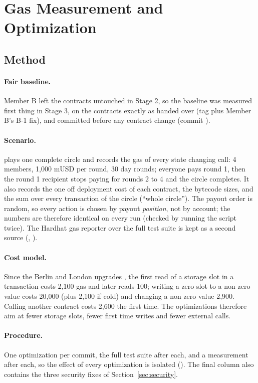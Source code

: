 \section{Gas Measurement and Optimization}
\label{sec:gas}

\subsection{Method}
\paragraph{Fair baseline.} Member B left the contracts untouched in Stage 2, so the baseline was
measured first thing in Stage 3, on the contracts exactly as handed over (tag  plus
Member B's B-1 fix), and committed before any contract change (commit ).

\paragraph{Scenario.}  plays one complete circle and records the gas of
every state changing call: 4 members, 1,000 mUSD per round, 30 day rounds; everyone pays round 1, then
the round 1 recipient stops paying for rounds 2 to 4 and the circle completes. It also records the
one off deployment cost of each contract, the bytecode sizes, and the sum over every transaction of
the circle (\enquote{whole circle}). The payout order is random, so every action is chosen by payout
\emph{position}, not by account; the numbers are therefore identical on every run (checked by
running the script twice). The Hardhat gas reporter over the full test suite is kept as a second
source (, ).

\paragraph{Cost model.} Since the Berlin and London upgrades \cite{eip2929,eip3529}, the first read of a
storage slot in a transaction costs 2,100 gas and later reads 100; writing a zero slot to a non zero
value costs 20,000 (plus 2,100 if cold) and changing a non zero value 2,900. Calling another
contract costs 2,600 the first time. The optimizations therefore aim at fewer storage slots, fewer
first time writes and fewer external calls.

\paragraph{Procedure.} One optimization per commit, the full test suite after each, and a measurement
after each, so the effect of every optimization is isolated (). The final
column also contains the three security fixes of Section~\ref{sec:security}.

